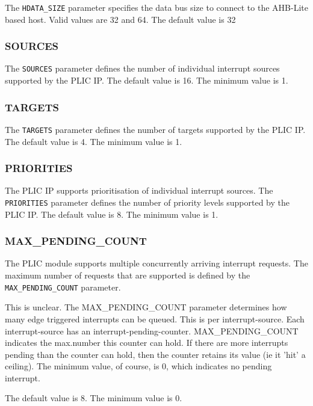 The \texttt{HDATA\_SIZE} parameter specifies the data bus size to
connect to the AHB-Lite based host. Valid values are 32 and 64. The
default value is 32

\hypertarget{SOURCES}{\subsubsection{SOURCES}\label{sec:SOURCES}}

The \texttt{SOURCES} parameter defines the number of individual
interrupt sources supported by the PLIC IP. The default value is 16. The
minimum value is 1.

\hypertarget{TARGETS}{\subsubsection{TARGETS}\label{sec:TARGETS}}

The \texttt{TARGETS} parameter defines the number of targets supported
by the PLIC IP. The default value is 4. The minimum value is 1.

\subsubsection{PRIORITIES}

\sloppy
The PLIC IP supports prioritisation of individual interrupt sources. The \texttt{PRIORITIES} parameter defines the number of priority levels supported by the PLIC IP. The default value is 8. The minimum value is 1.

\subsubsection{MAX\_PENDING\_COUNT}

\sloppy
The PLIC module supports multiple concurrently arriving interrupt
requests. The maximum number of requests that are supported is defined
by the \texttt{MAX\_PENDING\_COUNT} parameter.

\comment
This is unclear.
The MAX_PENDING_COUNT parameter determines how many edge triggered interrupts can be queued. This is per interrupt-source. Each interrupt-source has an interrupt-pending-counter. MAX_PENDING_COUNT indicates the max.number this counter can hold.
If there are more interrupts pending than the counter can hold, then the counter retains its value (ie it 'hit' a ceiling).
The minimum value, of course, is 0, which indicates no pending interrupt.
\endcomment

The default value is 8. The minimum value is 0.

